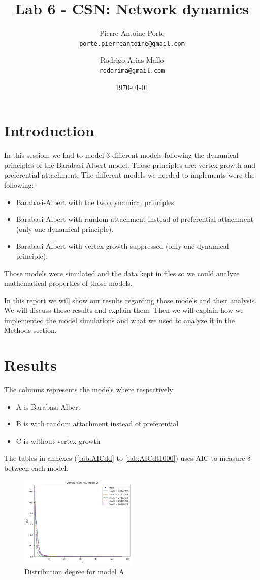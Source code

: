 \documentclass{article}
\title{Lab 6 - CSN: Network dynamics}
\author{Pierre-Antoine Porte \\ \texttt{porte.pierreantoine@gmail.com}
\and Rodrigo Arias Mallo \\ \texttt{rodarima@gmail.com}}
\date{\today}
\begin{document}
\maketitle

\section{Introduction}

In this session, we had to model 3 different models following the dynamical 
principles of the Barabasi-Albert  model. Those principles are: vertex growth 
and preferential attachment. The different models we needed to implements were 
the following:

\begin{itemize}
	\item Barabasi-Albert with the two dynamical principles
	\item Barabasi-Albert with random attachment instead of preferential
	attachment (only one dynamical principle).
	\item Barabasi-Albert with vertex growth suppressed (only one dynamical
	principle).
\end{itemize}

Those models were simulated and the data kept in files so we could analyze
mathematical properties of those models.

In this report we will show our results regarding those models and their
analysis. We will discuss those results and explain them. Then we will explain
how we implemented the model simulations and what we used to analyze it in the
Methods section.

\section{Results}

The columns represents the models where respectively:

\begin{itemize}
		\item A is Barabasi-Albert
		\item B is with random attachment instead of preferential
		\item C is without vertex growth
\end{itemize}

The tables in annexes (\ref{tab:AICdd} to \ref{tab:AICdt1000}) uses AIC to
measure $\delta$ between each model.

\begin{figure}[h]
    \centering
    \includegraphics[width=0.5\textwidth]{modelA/all_dd.png}
    \caption{Distribution degree for model A}
    \label{fig:all_dd_A}
\end{figure}
\end{document}
